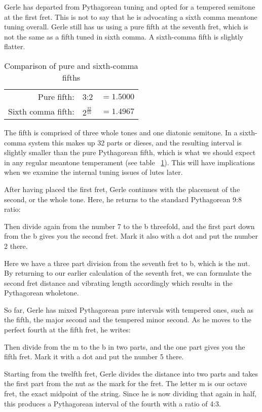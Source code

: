 Gerle has departed from Pythagorean tuning and opted for a tempered semitone at the first
fret.  This is not to say that he is advocating a sixth comma meantone tuning overall.
Gerle still has us using a pure fifth at the seventh fret, which is not the same as a
fifth tuned in sixth comma.  A sixth-comma fifth is slightly flatter.
\begin{table}[h!]
    \begin{center}
    \begin{tabular}{ r l l }
        Pure fifth:        & 3:2                 & $ = 1.5000 $ \\
        Sixth comma fifth: & $ 2^\frac{32}{55} $ & $ = 1.4967 $ \\
    \end{tabular}
    \end{center}
    \caption{Comparison of pure and sixth-comma fifths}
    \label{table:6fifths}
\end{table}
The fifth is comprised of three whole tones and one diatonic semitone. In a sixth-comma
system this makes up 32 parts or dieses, and the resulting interval is slightly smaller
than the pure Pythagorean fifth, which is what we should expect in any regular meantone
temperament (see table ~\ref{table:6fifths}). This will have implications when we examine
the internal tuning issues of lutes later.

After having placed the first fret, Gerle continues with the placement of the second, or the whole tone.
Here, he returns to the standard Pythagorean 9:8 ratio:
\begin{blocks}
Then divide again from the number 7 to the b threefold, and the first part down
from the b gives you the second fret.  Mark it also with a dot and put the
number 2 there.
\end{blocks}
Here we have a three part division from the seventh fret to b, which is the nut.
By returning to our earlier calculation of the seventh fret, we can formulate the
second fret distance and vibrating length accordingly which results in the Pythagorean
wholetone.

So far, Gerle has mixed Pythagorean pure intervals with tempered ones, such as
the fifth, the major second and the tempered minor second.  As he moves to the
perfect fourth at the fifth fret, he writes:
\begin{blocks}
Then divide from the m to the b in two parts, and the one part gives you the
fifth fret. Mark it with a dot and put the number 5 there.
\end{blocks}
Starting from the twelfth fret, Gerle divides the distance into two parts and takes the
first part from the nut as the mark for the fret. The letter m is our octave fret, the
exact midpoint of the string. Since he is now dividing that again in half, this
produces a Pythagorean interval of the fourth with a ratio of 4:3.

